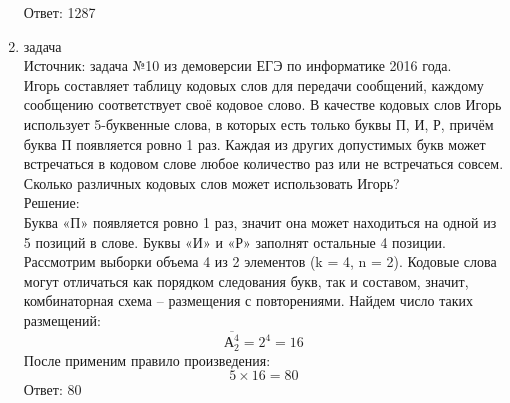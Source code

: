 \documentclass[a4paper,14pt]{extreport} %
\begin{document}
\begin{center}
\begin{enumerate}
						 Ответ: 1287
						 
						 
						  \item {\large задача  }\\
						 Источник: задача №10 из демоверсии ЕГЭ по информатике 2016 года.\\
						 \vspace{15pt}
						 Игорь составляет таблицу кодовых слов для передачи сообщений, каждому сообщению соответствует своё кодовое слово. В качестве кодовых слов Игорь использует 5-буквенные слова, в которых есть только буквы П, И, Р, причём буква П появляется ровно 1 раз. Каждая из других допустимых букв может встречаться в кодовом слове любое количество раз или не встречаться совсем. Сколько различных кодовых слов может использовать Игорь?
						 \\
						 \vspace{15pt}
						 Решение:\\
						 Буква «П» появляется ровно 1 раз, значит она может находиться на одной из 5 позиций в слове. Буквы «И» и «Р» заполнят остальные 4 позиции. Рассмотрим выборки объема 4 из 2 элементов (k = 4, n = 2). Кодовые слова могут отличаться как порядком следования букв, так и составом, значит, комбинаторная схема – размещения с повторениями. Найдем число таких размещений:
						 \begin{equation}
						 	\overline{А_{2}^4} = 2^4 = 16
						 \end{equation}
						 После применим правило произведения: 
						 \begin{equation}
						 	5 \times 16 = 80
						 \end{equation}
						 Ответ: 80
						 

\end{enumerate}
\end{center}
\end{document}
